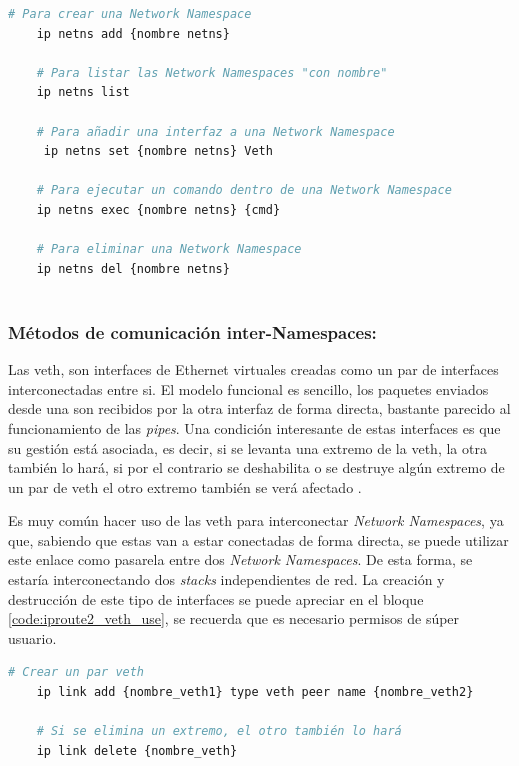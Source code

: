 \begin{lstlisting}[language= bash, style=Consola, caption={Comandos útiles con iproute2 - Netns},label=code:iproute2_ns_use]
    # Para crear una Network Namespace
    ip netns add {nombre netns}
    
    # Para listar las Network Namespaces "con nombre"
    ip netns list
    
    # Para añadir una interfaz a una Network Namespace
     ip netns set {nombre netns} Veth
    
    # Para ejecutar un comando dentro de una Network Namespace
    ip netns exec {nombre netns} {cmd}
    
    # Para eliminar una Network Namespace
    ip netns del {nombre netns}
    
\end{lstlisting}

\subsubsection{Métodos de comunicación inter-Namespaces: }
\label{linuxVeths}
Las \gls{veth}, son interfaces de Ethernet virtuales creadas como un par de interfaces interconectadas entre si. El modelo funcional es sencillo, los paquetes enviados desde una son recibidos por la otra interfaz de forma directa, bastante parecido al funcionamiento de las \textit{pipes}. Una condición interesante de estas interfaces es que su gestión está asociada, es decir, si se levanta una extremo de la \gls{veth}, la otra también lo hará, si por el contrario se deshabilita o se destruye algún extremo de un par de \gls{veth} el otro extremo también se verá afectado \cite{veth}.\\
\par
Es muy común hacer uso de las \gls{veth} para interconectar \textit{Network Namespaces}, ya que, sabiendo que estas van a estar conectadas de forma directa, se puede utilizar este enlace como pasarela entre dos \textit{Network Namespaces}. De esta forma, se estaría interconectando dos \textit{stacks} independientes de red. La creación y destrucción de este tipo de interfaces se puede apreciar en el bloque \ref{code:iproute2_veth_use}, se recuerda que es necesario permisos de súper usuario.\\

\begin{lstlisting}[language= bash, style=Consola, caption={Manejo de Veths},label=code:iproute2_veth_use]
    # Crear un par veth
    ip link add {nombre_veth1} type veth peer name {nombre_veth2}
    
    # Si se elimina un extremo, el otro también lo hará
    ip link delete {nombre_veth}
    
\end{lstlisting}
\vspace{0.5cm}

